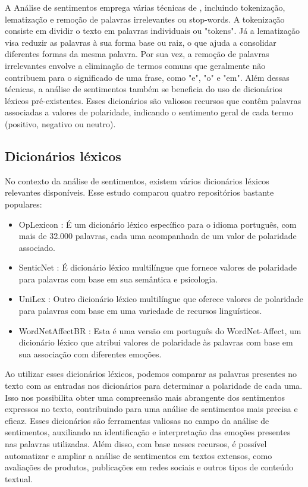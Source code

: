 A Análise de sentimentos emprega várias técnicas de , incluindo tokenização, lematização e remoção de palavras irrelevantes ou stop-words. A tokenização consiste em dividir o texto em palavras individuais ou "tokens". Já a lematização visa reduzir as palavras à sua forma base ou raiz, o que ajuda a consolidar diferentes formas da mesma palavra. Por sua vez, a remoção de palavras irrelevantes envolve a eliminação de termos comuns que geralmente não contribuem para o significado de uma frase, como "e", "o" e "em". Além dessas técnicas, a análise de sentimentos também se beneficia do uso de dicionários léxicos pré-existentes. Esses dicionários são valiosos recursos que contêm palavras associadas a valores de polaridade, indicando o sentimento geral de cada termo (positivo, negativo ou neutro).

\subsection{Dicionários léxicos}

No contexto da análise de sentimentos, existem vários dicionários léxicos relevantes disponíveis. Esse estudo comparou quatro repositórios bastante populares:

\begin{itemize}
	\item OpLexicon \cite{2011_Souza_IP}: É um dicionário léxico específico para o idioma português, com mais de 32.000 palavras, cada uma acompanhada de um valor de polaridade associado.
	\item SenticNet \cite{2016_Cambria_IP}: É dicionário léxico multilíngue que fornece valores de polaridade para palavras com base em sua semântica e psicologia.
	\item UniLex \cite{2017_Souza}: Outro dicionário léxico multilíngue que oferece valores de polaridade para palavras com base em uma variedade de recursos linguísticos.
	\item WordNetAffectBR \cite{2008_Pasqualotti}: Esta é uma versão em português do WordNet-Affect, um dicionário léxico que atribui valores de polaridade às palavras com base em sua associação com diferentes emoções.
\end{itemize}

Ao utilizar esses dicionários léxicos, podemos comparar as palavras presentes no texto com as entradas nos dicionários para determinar a polaridade de cada uma. Isso nos possibilita obter uma compreensão mais abrangente dos sentimentos expressos no texto, contribuindo para uma análise de sentimentos mais precisa e eficaz. Esses dicionários são ferramentas valiosas no campo da análise de sentimentos, auxiliando na identificação e interpretação das emoções presentes nas palavras utilizadas. Além disso, com base nesses recursos, é possível automatizar e ampliar a análise de sentimentos em textos extensos, como avaliações de produtos, publicações em redes sociais e outros tipos de conteúdo textual.

